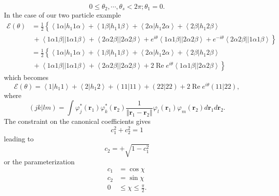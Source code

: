 \documentclass[aps,preprint]{revtex4}%
\begin{document}
\[
0\leq\theta_{2},\cdots,\theta_{s}<2\pi;\theta_{1}=0.
\]
In the case of our two particle example
\begin{align*}
\mathcal{E}\left(  \theta\right)   &  =\frac{1}{2}\left\{  \overset
{}{\left\langle 1\alpha\left\vert h_{1}1\alpha\right.  \right\rangle
+\left\langle 1\beta\left\vert h_{1}1\beta\right.  \right\rangle +\left\langle
2\alpha\left\vert h_{1}2\alpha\right.  \right\rangle +\left\langle
2\beta\left\vert h_{1}2\beta\right.  \right\rangle }\right. \\
&  \left.  \,+\left\langle 1\alpha1\beta\right\vert \left\vert 1\alpha
1\beta\right\rangle +\left\langle 2\alpha2\beta\right\vert \left\vert
2\alpha2\beta\right\rangle +e^{i\theta}\left\langle 1\alpha1\beta\right\vert
\left\vert 2\alpha2\beta\right\rangle +e^{-i\theta}\left\langle 2\alpha
2\beta\right\vert \left\vert 1\alpha1\beta\right\rangle \overset{}{}\right\}
\\
&  =\frac{1}{2}\left\{  \overset{}{\left\langle 1\alpha\left\vert h_{1}%
1\alpha\right.  \right\rangle +\left\langle 1\beta\left\vert h_{1}%
1\beta\right.  \right\rangle +\left\langle 2\alpha\left\vert h_{1}%
2\alpha\right.  \right\rangle +\left\langle 2\beta\left\vert h_{1}%
2\beta\right.  \right\rangle }\right. \\
&  \left.  \,+\left\langle 1\alpha1\beta\right\vert \left\vert 1\alpha
1\beta\right\rangle +\left\langle 2\alpha2\beta\right\vert \left\vert
2\alpha2\beta\right\rangle +2\operatorname{Re}e^{i\theta}\left\langle
1\alpha1\beta\right\vert \left\vert 2\alpha2\beta\right\rangle \overset{}%
{}\right\}
\end{align*}
which becomes%
\[
\mathcal{E}\left(  \theta\right)  =\left\langle 1\left\vert h_{1}1\right.
\right\rangle +\left\langle 2\left\vert h_{1}2\right.  \right\rangle +\left(
\left.  11\right\vert 11\right)  +\left(  \left.  22\right\vert 22\right)
+2\operatorname{Re}e^{i\theta}\left(  \left.  11\right\vert 22\right)  ,
\]
where
\[
\left(  \left.  jk\right\vert lm\right)  =\int\varphi_{j}^{\ast}\left(
\mathbf{r}_{1}\right)  \varphi_{k}^{\ast}\left(  \mathbf{r}_{2}\right)
\frac{1}{\left\Vert \mathbf{r}_{1}-\mathbf{r}_{2}\right\Vert }\varphi
_{l}\left(  \mathbf{r}_{1}\right)  \varphi_{m}\left(  \mathbf{r}_{2}\right)
d\mathbf{r}_{1}d\mathbf{r}_{2}.
\]
The constraint on the canonical coefficients gives
\[
c_{1}^{2}+c_{2}^{2}=1
\]
leading to
\[
c_{2}=+\sqrt{1-c_{1}^{2}}%
\]
or the parameterization
\begin{align*}
c_{1}  &  =\cos\chi\\
c_{2}  &  =\sin\chi\\
0  &  \leq\chi\leq\frac{\pi}{2}.
\end{align*}
\end{document}
